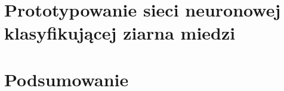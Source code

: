\documentclass[a4paper, 12pt]{report}
\begin{document}
\chapter{Prototypowanie sieci neuronowej klasyfikującej ziarna miedzi}


\chapter{Podsumowanie} \label{ch:summary}


\begin{appendices}
	
\end{appendices}

\newpage

\listoffigures
\listoftables
\listoflistings

\nocite{*}


\end{document}
